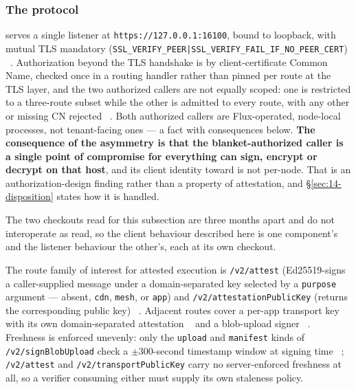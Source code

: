 \subsubsection{The \fluxsas protocol}

\fluxsas serves a single listener at \texttt{https:/\allowbreak{}/\allowbreak{}127.\allowbreak{}0.\allowbreak{}0.\allowbreak{}1:16100}, bound to loopback, with
mutual TLS mandatory (\texttt{SSL\_VERIFY\_PEER\allowbreak\;|\;SSL\_VERIFY\_FAIL\_IF\_NO\_PEER\_CERT})
\shipped~. Authorization beyond the TLS
handshake is by client-certificate Common Name, checked once in a routing handler rather than
pinned per route at the TLS layer, and the two authorized callers are not equally scoped: one is
restricted to a three-route subset while the other is admitted to every route, with any
other or missing CN rejected \shipped~. Both authorized callers are
Flux-operated, node-local
processes, not tenant-facing ones — a fact with consequences below. \textbf{The consequence of the
asymmetry is that the blanket-authorized caller is a single point of compromise for everything
\fluxsas can sign, encrypt or decrypt on that host}, and its client identity toward \fluxsas is not
per-node. That is an authorization-design finding rather than a property of attestation, and
\S\ref{sec:14-disposition} states how it is handled.

The two checkouts read for this subsection are three months apart and do not interoperate as read,
so the client behaviour described here is one component's and the listener behaviour the other's,
each at its own checkout.

The route family of interest for attested execution is \texttt{/v2/attest} (Ed25519-signs a
caller-supplied message under a domain-separated key selected by a \texttt{purpose} argument —
absent, \texttt{cdn}, \texttt{mesh}, or \texttt{app}) and \texttt{/\allowbreak{}v2/\allowbreak{}attestationPublicKey} (returns
the corresponding public key) \shipped~.
Adjacent routes cover a per-app transport key with its own domain-separated attestation
\shipped~ and a blob-upload signer
\shipped~. Freshness is enforced unevenly: only the
\texttt{upload} and \texttt{manifest} kinds of \texttt{/\allowbreak{}v2/\allowbreak{}sign\allowbreak{}Blob\allowbreak{}Upload} check a $\pm300$-second
timestamp window at signing time \shipped~;
\texttt{/v2/attest} and \texttt{/\allowbreak{}v2/\allowbreak{}transportPublicKey} carry no server-enforced freshness at all,
so a verifier consuming either must supply its own staleness policy.

